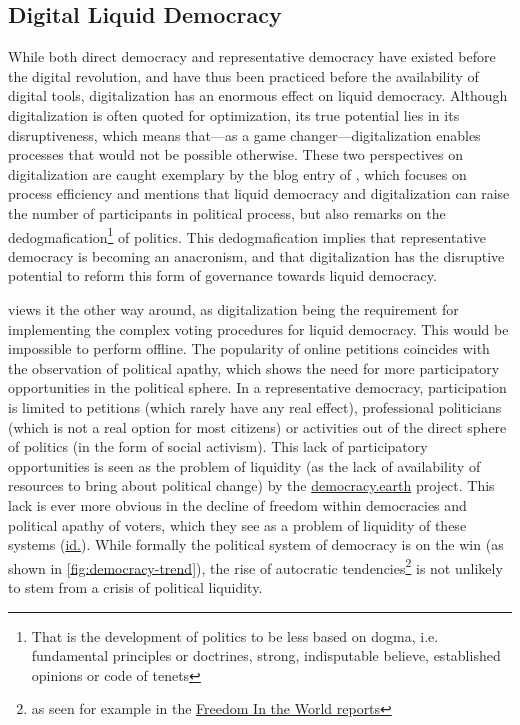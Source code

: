\subsection{Digital Liquid Democracy}
\label{ssec:Digital_LD}
While both direct democracy and representative democracy have existed before the digital revolution, and have thus been practiced before the availability of digital tools, digitalization has an enormous effect on liquid democracy. Although digitalization is often quoted for optimization, its true potential lies in its disruptiveness, which means that---as a game changer---digitalization enables processes that would not be possible otherwise. These two perspectives on digitalization are caught exemplary by the blog entry of \textcite{Veuve2015}, which focuses on process efficiency and mentions that liquid democracy and digitalization can raise the number of participants in political process, but also remarks on the dedogmafication\footnote{That is the development of politics to be less based on dogma, i.e. fundamental principles or doctrines, strong, indisputable believe, established opinions or code of tenets}  of politics. This dedogmafication implies that representative democracy is becoming an anacronism, and that digitalization has the disruptive potential to reform this form of governance towards liquid democracy. 

\textcite{Bargmann2017} views it the other way around, as digitalization being the requirement for implementing the complex voting procedures for liquid democracy. This would be impossible to perform offline. 
The popularity of online petitions coincides with the observation of political apathy, which shows the need for more participatory opportunities in the political sphere. In a representative democracy, participation is limited to petitions (which rarely have any real effect), professional politicians (which is not a real option for most citizens) or activities out of the direct sphere of politics (in the form of social activism). This lack of participatory opportunities is seen as the problem of liquidity (as the lack of availability of resources to bring about political change) by the \href{https://www.democracy.earth/}{democracy.earth} project. This lack is ever more obvious in the decline of freedom within democracies and political apathy of voters, which they see as a problem of liquidity of these systems (\href{https://govfresh.com/2019/01/liquid-democracy-blockchains-and-governance-in-the-post-nation-state-era/}{id.}). While formally the political system of democracy is on the win (as shown in \autoref{fig:democracy-trend}), the rise of autocratic tendencies\footnote{as seen for example in the \href{https://freedomhouse.org/report/freedom-world/freedom-world-2019/democracy-in-retreat}{Freedom In the World reports}} is not unlikely to stem from a crisis of political liquidity.

